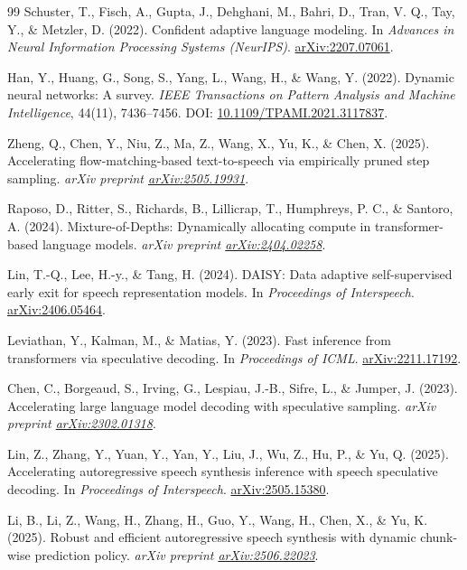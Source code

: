 \documentclass[11pt,a4paper]{article}
\begin{document}
\begin{thebibliography}{99}
Schuster, T., Fisch, A., Gupta, J., Dehghani, M., Bahri, D., Tran, V. Q., Tay, Y., \& Metzler, D. (2022).
Confident adaptive language modeling.
In \textit{Advances in Neural Information Processing Systems (NeurIPS)}.
\href{https://arxiv.org/abs/2207.07061}{arXiv:2207.07061}.

Han, Y., Huang, G., Song, S., Yang, L., Wang, H., \& Wang, Y. (2022).
Dynamic neural networks: A survey.
\textit{IEEE Transactions on Pattern Analysis and Machine Intelligence}, 44(11), 7436--7456.
DOI: \href{https://doi.org/10.1109/TPAMI.2021.3117837}{10.1109/TPAMI.2021.3117837}.

Zheng, Q., Chen, Y., Niu, Z., Ma, Z., Wang, X., Yu, K., \& Chen, X. (2025).
Accelerating flow-matching-based text-to-speech via empirically pruned step sampling.
\textit{arXiv preprint \href{https://arxiv.org/abs/2505.19931}{arXiv:2505.19931}}.

Raposo, D., Ritter, S., Richards, B., Lillicrap, T., Humphreys, P. C., \& Santoro, A. (2024).
Mixture-of-Depths: Dynamically allocating compute in transformer-based language models.
\textit{arXiv preprint \href{https://arxiv.org/abs/2404.02258}{arXiv:2404.02258}}.

Lin, T.-Q., Lee, H.-y., \& Tang, H. (2024).
DAISY: Data adaptive self-supervised early exit for speech representation models.
In \textit{Proceedings of Interspeech}.
\href{https://arxiv.org/abs/2406.05464}{arXiv:2406.05464}.

Leviathan, Y., Kalman, M., \& Matias, Y. (2023).
Fast inference from transformers via speculative decoding.
In \textit{Proceedings of ICML}.
\href{https://arxiv.org/abs/2211.17192}{arXiv:2211.17192}.

Chen, C., Borgeaud, S., Irving, G., Lespiau, J.-B., Sifre, L., \& Jumper, J. (2023).
Accelerating large language model decoding with speculative sampling.
\textit{arXiv preprint \href{https://arxiv.org/abs/2302.01318}{arXiv:2302.01318}}.

Lin, Z., Zhang, Y., Yuan, Y., Yan, Y., Liu, J., Wu, Z., Hu, P., \& Yu, Q. (2025).
Accelerating autoregressive speech synthesis inference with speech speculative decoding.
In \textit{Proceedings of Interspeech}.
\href{https://arxiv.org/abs/2505.15380}{arXiv:2505.15380}.

Li, B., Li, Z., Wang, H., Zhang, H., Guo, Y., Wang, H., Chen, X., \& Yu, K. (2025).
Robust and efficient autoregressive speech synthesis with dynamic chunk-wise prediction policy.
\textit{arXiv preprint \href{https://arxiv.org/abs/2506.22023}{arXiv:2506.22023}}.


\end{thebibliography}
\end{document}
